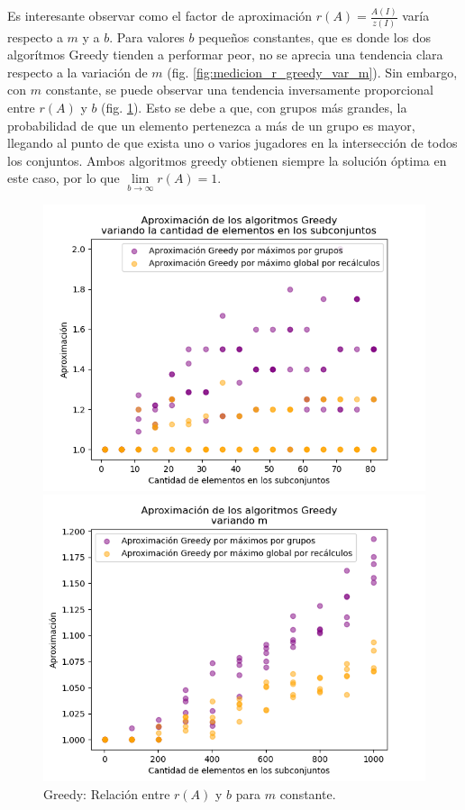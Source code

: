 Es interesante observar como el factor de aproximación $r(A)=\frac{A(I)}{z(I)}$ varía respecto a $m$ y a $b$. Para valores $b$ pequeños constantes, que es donde los dos algorítmos Greedy tienden a performar peor, no se aprecia una tendencia clara respecto a la variación de $m$ (fig. \ref{fig:medicion_r_greedy_var_m}). Sin embargo, con $m$ constante, se puede observar una tendencia inversamente proporcional entre $r(A)$ y $b$ (fig. \ref{fig:medicion_r_greedy_var_b}). Esto se debe a que, con grupos más grandes, la probabilidad de que un elemento pertenezca a más de un grupo es mayor, llegando al punto de que exista uno o varios jugadores en la intersección de todos los conjuntos. Ambos algoritmos greedy obtienen siempre la solución óptima en este caso, por lo que $\lim\limits_{b \rightarrow \infty}r(A)=1$.

\begin{figure}[h]
    \centering
    \begin{minipage}{0.45\textwidth}
        \centering
        \includegraphics[width=\textwidth]{img/medicion_r_greedy_var_b.png}
        \caption{Greedy: Relación entre $r(A)$ y $b$ para $m$ constante.}
        \label{fig:medicion_r_greedy_var_b}
    \end{minipage}\hfill
    \begin{minipage}{0.45\textwidth}
        \centering
        \includegraphics[width=\textwidth]{img/medicion_r_greedy_var_m.png}

\end{minipage}
\end{figure}
